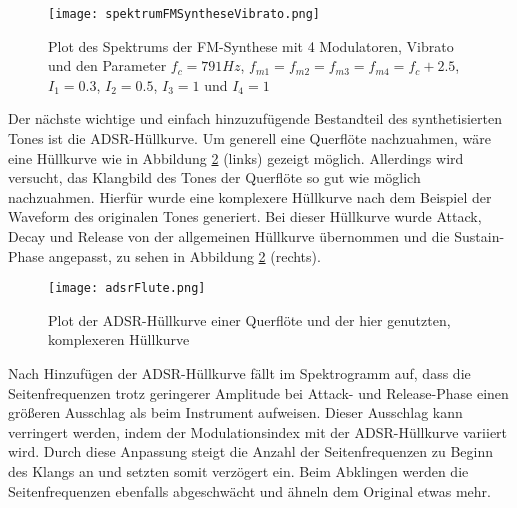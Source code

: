 \begin{figure} [ht]
\centering
  \texttt{[image: spektrumFMSyntheseVibrato.png]}
\caption{Plot des Spektrums der FM-Synthese mit 4 Modulatoren, Vibrato und den Parameter $f_c = 791 Hz$, $f_{m1} = f_{m2} = f_{m3} = f_{m4} = f_c + 2.5$, $I_1 = 0.3$, $I_2 = 0.5$, $I_3 = 1$ und $I_4 = 1$}
\label{fig:spektrumFMSyntheseVibrato}
\end{figure}

Der nächste wichtige und einfach hinzuzufügende Bestandteil des synthetisierten Tones ist die ADSR-Hüllkurve. Um generell eine Querflöte nachzuahmen, wäre eine Hüllkurve wie in Abbildung \ref{fig:adsrFlute} (links) gezeigt möglich. Allerdings wird versucht, das Klangbild des Tones der Querflöte so gut wie möglich nachzuahmen. Hierfür wurde eine komplexere Hüllkurve nach dem Beispiel der Waveform des originalen Tones generiert. Bei dieser Hüllkurve wurde Attack, Decay und Release von der allgemeinen Hüllkurve übernommen und die Sustain-Phase angepasst, zu sehen in Abbildung \ref{fig:adsrFlute} (rechts). 

\begin{figure} [ht]
\centering
  \texttt{[image: adsrFlute.png]}
\caption{Plot der ADSR-Hüllkurve einer Querflöte und der hier genutzten, komplexeren Hüllkurve}
\label{fig:adsrFlute}
\end{figure}

Nach Hinzufügen der ADSR-Hüllkurve fällt im Spektrogramm auf, dass die Seitenfrequenzen trotz geringerer Amplitude bei Attack- und Release-Phase einen größeren Ausschlag als beim Instrument aufweisen. Dieser Ausschlag kann verringert werden, indem der Modulationsindex mit der ADSR-Hüllkurve variiert wird. Durch diese Anpassung steigt die Anzahl der Seitenfrequenzen zu Beginn des Klangs an und setzten somit verzögert ein. Beim Abklingen werden die Seitenfrequenzen ebenfalls abgeschwächt und ähneln dem Original etwas mehr.

